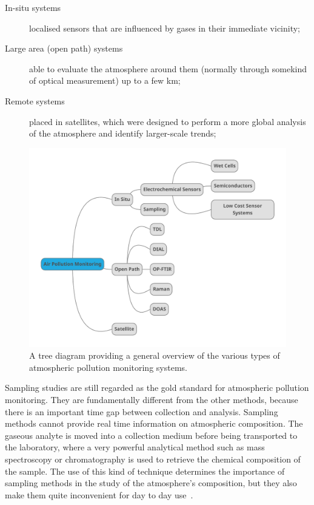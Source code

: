 \begin{description}
    \item[In-situ systems] localised sensors that are influenced by
        gases in their immediate vicinity;
    \item[Large area (open path) systems] able to evaluate the
        atmosphere around them (normally through somekind of optical
        measurement) up to a few km;
    \item[Remote systems] placed in satellites, which were designed to
        perform a more global analysis of the atmosphere and identify
        larger-scale trends;
\end{description}

\begin{figure}[htpb]
    \centering
    \includegraphics[width=.8\textwidth]{img/pdf/air_pollution_monitoring_tree.pdf}
    \caption{A tree diagram providing a general overview of the various
    types of atmospheric pollution monitoring systems. }%
    \label{fig:pollution_monitoring_tree}
\end{figure}

Sampling studies are still regarded as the gold standard for atmospheric
pollution monitoring. They are fundamentally different from the other
methods, because there is an important time gap between collection and
analysis. Sampling methods cannot provide real time information on
atmospheric composition. The gaseous analyte is moved into a collection
medium before being transported to the laboratory, where a very powerful
analytical method such as mass spectroscopy or chromatography is used to
retrieve the chemical composition of the sample. The use of this kind of
technique determines the importance of sampling methods in the study of
the atmosphere's composition, but they also make them quite inconvenient
for day to day use~\cite{Vallero2014}.

